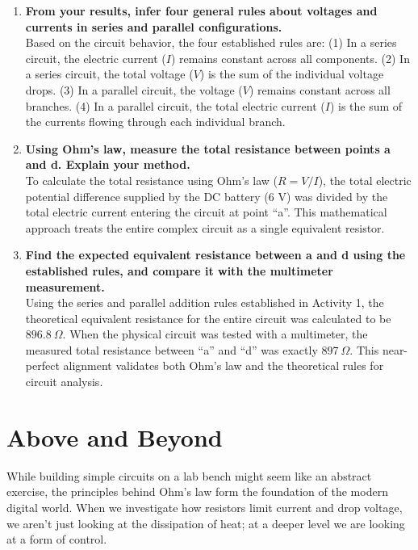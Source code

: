\documentclass[12pt]{article}
\begin{document}
\begin{enumerate}
  \item \textbf{From your results, infer four general rules about voltages and
        currents in series and parallel configurations.} \\
        Based on the circuit behavior, the four established rules are: (1) In a
        series circuit, the electric current ($I$) remains constant across all
        components. (2) In a series circuit, the total voltage ($V$) is the sum
        of the individual voltage drops. (3) In a parallel circuit, the voltage
        ($V$) remains constant across all branches. (4) In a parallel circuit,
        the total electric current ($I$) is the sum of the currents flowing
        through each individual branch.

  \item \textbf{Using Ohm's law, measure the total resistance between points a
        and d. Explain your method.} \\
        To calculate the total resistance using Ohm's law ($R = V/I$), the total
        electric potential difference supplied by the DC battery ($6\text{ V}$)
        was divided by the total electric current entering the circuit at point
        ``a''. This mathematical approach treats the entire complex circuit as a
        single equivalent resistor.

  \item \textbf{Find the expected equivalent resistance between a and d using
        the established rules, and compare it with the multimeter measurement.}
        \\
        Using the series and parallel addition rules established in Activity 1,
        the theoretical equivalent resistance for the entire circuit was
        calculated to be $896.8~\Omega$. When the physical circuit was tested
        with a multimeter, the measured total resistance between ``a'' and ``d'' was
        exactly $897~\Omega$. This near-perfect alignment validates both Ohm's
        law and the theoretical rules for circuit analysis.
\end{enumerate}

\section{Above and Beyond}

While building simple circuits on a lab bench might seem like an abstract
exercise, the principles behind Ohm's law form the foundation of the modern
digital world. When we investigate how resistors limit current and drop
voltage, we aren't just looking at the dissipation of heat; at a deeper level we
are looking at a form of control.
\end{document}
